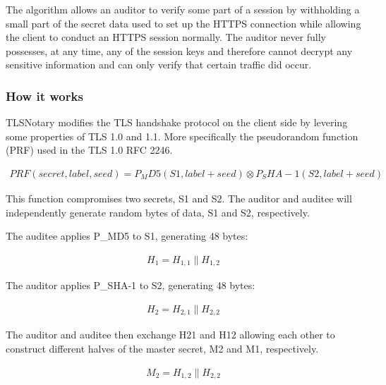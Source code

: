 The algorithm allows an auditor to verify some part of a session by withholding a small part of the secret data used to set up the HTTPS connection while allowing the client to conduct an HTTPS session normally. The auditor never fully possesses, at any time, any of the session keys and therefore cannot decrypt any sensitive information and can only verify that certain traffic did occur.

\subsubsection{How it works}
TLSNotary modifies the TLS handshake protocol on the client side by levering some properties of TLS 1.0 and 1.1. More specifically the pseudorandom function (PRF) used in the TLS 1.0 RFC 2246.

\begin{ceqn}
    \begin{align}
        PRF(secret,label,seed) = P_MD5(S1,label+seed) \otimes P_SHA-1(S2,label+seed)
    \end{align}
\end{ceqn}

This function compromises two secrets, S1 and S2. The auditor and auditee will independently generate random bytes of data, S1 and S2, respectively.

The auditee applies P\_MD5 to S1, generating 48 bytes:

\begin{ceqn}
    \begin{align}
        H_{1} = H_{1,1} \parallel H_{1,2}
    \end{align}
\end{ceqn}

The auditor applies P\_SHA-1 to S2, generating 48 bytes:

\begin{ceqn}
    \begin{align}
        H_{2} = H_{2,1} \parallel H_{2,2}
    \end{align}
\end{ceqn}


The auditor and auditee then exchange H21 and H12 allowing each other to construct different halves of the master secret, M2 and M1, respectively.

\begin{ceqn}
    \begin{align}
        M_{2} = H_{1,2} \parallel H_{2,2}
    \end{align}
\end{ceqn}

